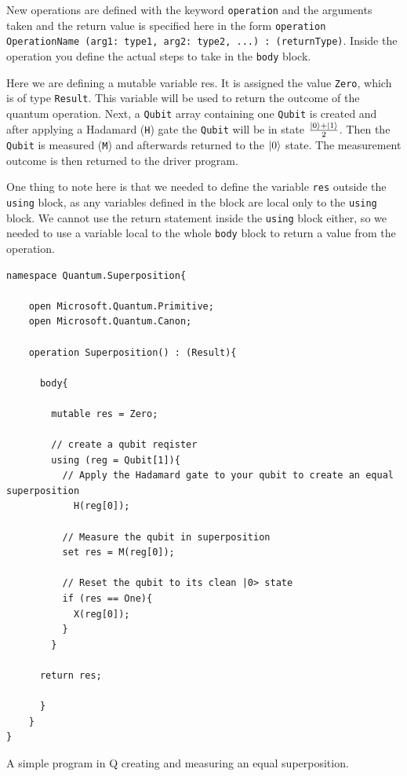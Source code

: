 New operations are defined with the keyword \texttt{operation} and the arguments taken and the return value is specified here in the form \texttt{operation OperationName (arg1: type1, arg2: type2, ...) : (returnType)}.
Inside the operation you define the actual steps to take in the \texttt{body} block. 

Here we are defining a mutable variable res. It is assigned the value \texttt{Zero}, which is of type \texttt{Result}. This variable will be used to return the outcome of the quantum operation. Next, a \texttt{Qubit} array containing one \texttt{Qubit} is created and after applying a Hadamard (\texttt{H}) gate the \texttt{Qubit} will be in state $\frac{\left\vert{0}\right\rangle+\left\vert{1}\right\rangle}{2}$. Then the \texttt{Qubit} is measured (\texttt{M}) and afterwards returned to the $\left\vert{0}\right\rangle$ state. The measurement outcome is then returned to the driver program. 

One thing to note here is that we needed to define the variable \texttt{res} outside the \texttt{using} block, as any variables defined in the block are local only to the \texttt{using} block. We cannot use the return statement inside the \texttt{using} block either, so we needed to use a variable local to the whole \texttt{body} block to return a value from the operation.\\

\begin{listing}[H]
\begin{verbatim}
namespace Quantum.Superposition{

    open Microsoft.Quantum.Primitive;
    open Microsoft.Quantum.Canon;

    operation Superposition() : (Result){

      body{

        mutable res = Zero;

	    // create a qubit reqister
	    using (reg = Qubit[1]){
	      // Apply the Hadamard gate to your qubit to create an equal superposition
            H(reg[0]);

	      // Measure the qubit in superposition
	      set res = M(reg[0]);

	      // Reset the qubit to its clean |0> state
	      if (res == One){
	        X(reg[0]);
	      }
	    }

      return res;
            
      }
    }
}
\end{verbatim}
\caption{A simple program in Q creating and measuring an equal superposition.}
\label{lst:QSimple}
\end{listing}


